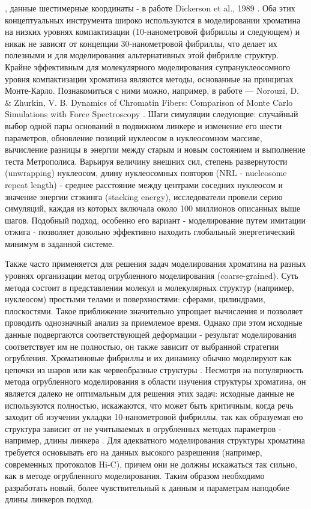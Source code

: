 \cite{olson_influence_1993}, данные шестимерные координаты - в работе Dickerson et al., 1989 \cite{dickerson_definitions_1989}. Оба этих концептуальных инструмента широко используются в моделировании хроматина на низких уровнях компактизации (10-нанометровой фибриллы и следующем) и никак не зависят от концепции 30-нанометровой фибриллы, что делает их полезными и для моделирования альтернативных этой фибрилле структур. Крайне эффективным для молекулярного моделирования супрануклеосомного уровня компактизации хроматина являются методы, основанные на принципах Монте-Карло. Познакомиться с ними можно, например, в работе — Norouzi, D. \& Zhurkin, V. B. Dynamics of Chromatin Fibers: Comparison of Monte Carlo Simulations with Force Spectroscopy \cite{norouzi_dynamics_2018}. Шаги симуляции следующие: случайный выбор одной пары оснований в подвижном линкере и изменение его шести параметров, обновление позиций нуклеосом в нуклеосомном массиве, вычисление разницы в энергии между старым и новым состоянием и выполнение теста Метрополиса. Варьируя величину внешних сил, степень развернутости (unwrapping) нуклеосом, длину нуклеосомных повторов (NRL - nucleosome repeat length) - среднее расстояние между центрами соседних нуклеосом и значение энергии стэкинга (stacking energy), исследователи провели серию симуляций, каждая из которых включала около 100 миллионов описанных выше шагов. Подобный подход, особенно его вариант - моделирование путем имитации отжига - позволяет довольно эффективно находить глобальный энергетический минимум в заданной системе.
    
    Также часто применяется для решения задач моделирования хроматина на разных уровнях организации метод огрубленного моделирования (coarse-grained). Суть метода состоит в представлении молекул и молекулярных структур (например, нуклеосом) простыми телами и поверхностями: сферами, цилиндрами, плоскостями. Такое приближение значительно упрощает вычисления и позволяет проводить однозначный анализ за приемлемое время. Однако при этом исходные данные подвергаются соответствующей деформации - результат моделирования соответствует им не полностью, он также зависит от выбранной стратегии огрубления. Хроматиновые фибриллы и их динамику обычно моделируют как цепочки из шаров или как червеобразные структуры \cite{korolev_systematic_2018,savelyev_molecular_2009,ozer_chromatin_2015}. Несмотря на популярность метода огрубленного моделирования в области изучения структуры хроматина, он является далеко не оптимальным для решения этих задач: исходные данные не используются полностью, искажаются, что может быть критичным, когда речь заходит об изучении укладки 10-нанометровой фибриллы, так как образуемая ею структура зависит от не учитываемых в огрубленных методах параметров - например, длины линкера \cite{norouzi_topological_2015,nikitina_dna_2017,norouzi_topological_2015}. Для адекватного моделирования структуры хроматина требуется основывать его на данных высокого разрешения (например, современных протоколов Hi-C), причем они не должны искажаться так сильно, как в методе огрубленного моделирования. Таким образом необходимо разработать новый, более чувствительный к данным и параметрам наподобие длины линкеров подход. 

